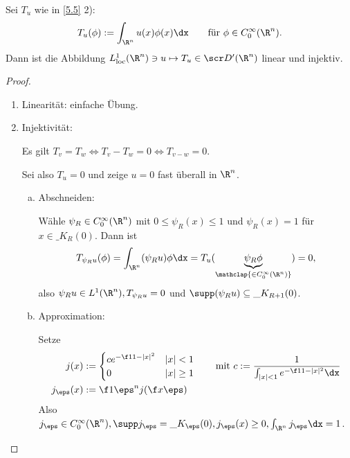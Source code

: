 \begin{st} \label{5.7}
	Sei $T_u$ wie in \ref{5.5} 2):
	\[
		T_u(\phi) := \int_{\R^n} u(x) \phi(x) \dx \qquad \text{für $\phi \in C_0^\infty(\R^n)$}.
	\]
	Dann ist die Abbildung $L_{\text{loc}}^1(\R^n) \ni u \mapsto T_u \in \scr D'(\R^n)$ linear und injektiv.
	\begin{proof}
		\begin{enumerate}[1)]
			\item
				Linearität: einfache Übung.
			\item
				Injektivität:
				
				Es gilt $T_v = T_w \iff T_v - T_w = 0 \iff T_{v-w} = 0$. 

				Sei also $T_u = 0$ und zeige $u = 0$ fast überall in $\R^n$.
				\begin{enumerate}[a)]
					\item
						Abschneiden:

						Wähle $\psi_R \in C_0^\infty(\R^n)$ mit $0 \le \psi_{R}(x) \le 1$ und $\psi_R(x) = 1$ für $x \in \_{K_R(0)}$.
						Dann ist
						\[
							T_{\psi_R u} (\phi) 
							= \int_{\R^n} (\psi_R u) \phi \dx 
							= T_u (\underbrace{\psi_R \phi}_{\mathclap{\in C_0^\infty(\R^n)}})
							= 0,
						\]
						also $\psi_R u \in L^1(\R^n), T_{\psi_R u} = 0$ und $\supp(\psi_R u) \subset \_{K_{R+1}(0)}$.
					\item
						Approximation:

						Setze
						\begin{align*}
							j(x) &:= \begin{cases}
								c e^{-\f 1{1-|x|^2}} & |x| < 1 \\
								0 & |x| \ge 1
							\end{cases} \qquad \text{mit }
							c := \dfrac 1{\int_{|x|< 1} e^{-\f 1{1-|x|^2}} \dx} \\
							j_\eps(x) &:= \f 1{\eps^n} j(\f x\eps)
						\end{align*}
						Also $j_\eps \in C_0^\infty(\R^n), \supp j_\eps = \_{K_\eps(0)}, j_\eps(x) \ge 0, \int_{\R^n} j_\eps \dx = 1$.


\end{enumerate}
\end{enumerate}
\end{proof}
\end{st}
